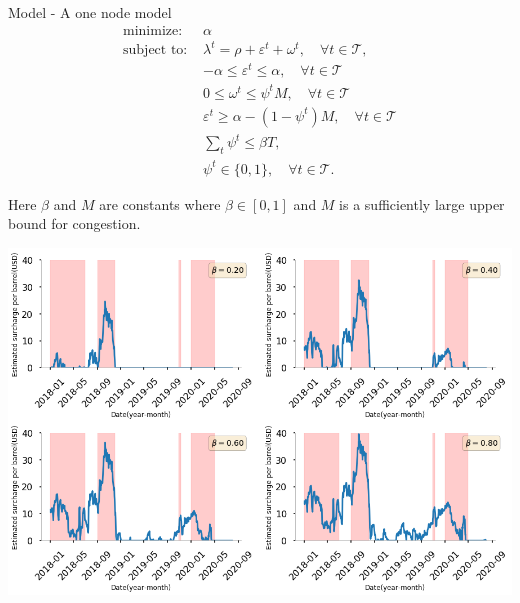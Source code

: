 \documentclass[aspectratio = 169]{beamer}
\newcommand{\T}{\mathcal{T}}
\begin{document}
\begin{frame}{Model - A one node model}
\begin{align*}
\text{minimize: } &\alpha\\\label{2}
\text{subject to: } &\lambda^t = \rho + \varepsilon^t +\omega^t, \quad \forall t\in\T,\\
&-\alpha\leq\varepsilon^t \leq \alpha,\quad \forall t\in \T\\
&0\leq\omega^t\leq \psi^t M,\quad \forall t\in\T\\
&\varepsilon^t \geq \alpha - (1-\psi^t) M,\quad \forall t\in \T\\
&\sum_t \psi^t \leq \beta T,\\
&\psi^t \in\{0,1\}, \quad \forall t\in \T.
\end{align*}

Here $\beta$ and $M$ are constants where $\beta \in [0,1]$ and $M$ is a sufficiently large upper bound for congestion.
\end{frame}

\begin{frame}{}
\centering
\vspace{-0.5cm}
\includegraphics[scale = 0.4]{image3.png}
\end{frame}
\end{document}
